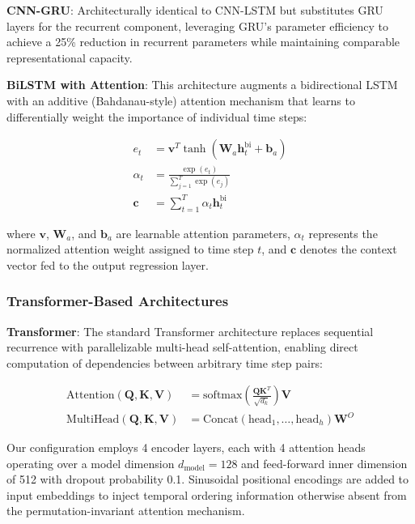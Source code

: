 \documentclass[conference]{IEEEtran}
\begin{document}
\textbf{CNN-GRU}: Architecturally identical to CNN-LSTM but substitutes GRU layers for the recurrent component, leveraging GRU's parameter efficiency to achieve a 25\% reduction in recurrent parameters while maintaining comparable representational capacity.

\textbf{BiLSTM with Attention}: This architecture augments a bidirectional LSTM with an additive (Bahdanau-style) attention mechanism that learns to differentially weight the importance of individual time steps:

\begin{align}
e_t &= \mathbf{v}^{T} \tanh(\mathbf{W}_a \mathbf{h}_t^{\text{bi}} + \mathbf{b}_a)\\
\alpha_t &= \frac{\exp(e_t)}{\sum_{j=1}^{T} \exp(e_j)}\\
\mathbf{c} &= \sum_{t=1}^{T} \alpha_t \mathbf{h}_t^{\text{bi}}
\label{eq:attention_c}
\end{align}

where $\mathbf{v}$, $\mathbf{W}_a$, and $\mathbf{b}_a$ are learnable attention parameters, $\alpha_t$ represents the normalized attention weight assigned to time step $t$, and $\mathbf{c}$ denotes the context vector fed to the output regression layer.

\subsubsection{Transformer-Based Architectures}

\textbf{Transformer}: The standard Transformer architecture \cite{vaswani2017} replaces sequential recurrence with parallelizable multi-head self-attention, enabling direct computation of dependencies between arbitrary time step pairs:

\begin{align}
\text{Attention}(\mathbf{Q}, \mathbf{K}, \mathbf{V}) &= \text{softmax}\left(\frac{\mathbf{Q}\mathbf{K}^{T}}{\sqrt{d_k}}\right) \mathbf{V}\\
\text{MultiHead}(\mathbf{Q}, \mathbf{K}, \mathbf{V}) &= \text{Concat}(\text{head}_1, \ldots, \text{head}_h) \mathbf{W}^{O} \label{eq:mha}
\end{align}

Our configuration employs 4 encoder layers, each with 4 attention heads operating over a model dimension $d_{\text{model}} = 128$ and feed-forward inner dimension of 512 with dropout probability 0.1. Sinusoidal positional encodings are added to input embeddings to inject temporal ordering information otherwise absent from the permutation-invariant attention mechanism.
\end{document}
